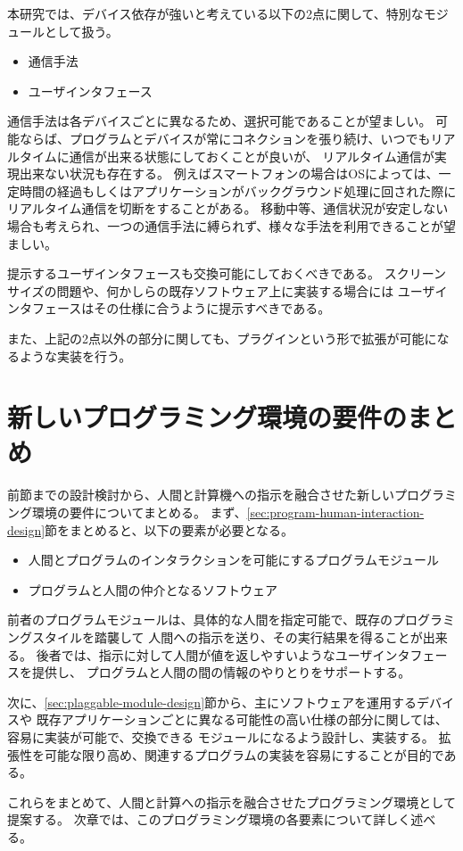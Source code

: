 本研究では、デバイス依存が強いと考えている以下の2点に関して、特別なモジュールとして扱う。

\begin{itemize}
\itemsep1pt\parskip0pt
\item
  通信手法
\item
  ユーザインタフェース
\end{itemize}

通信手法は各デバイスごとに異なるため、選択可能であることが望ましい。
可能ならば、プログラムとデバイスが常にコネクションを張り続け、いつでもリアルタイムに通信が出来る状態にしておくことが良いが、
リアルタイム通信が実現出来ない状況も存在する。
例えばスマートフォンの場合はOSによっては、一定時間の経過もしくはアプリケーションがバックグラウンド処理に回された際に
リアルタイム通信を切断をすることがある。
移動中等、通信状況が安定しない場合も考えられ、一つの通信手法に縛られず、様々な手法を利用できることが望ましい。

提示するユーザインタフェースも交換可能にしておくべきである。
スクリーンサイズの問題や、何かしらの既存ソフトウェア上に実装する場合には
ユーザインタフェースはその仕様に合うように提示すべきである。

また、上記の2点以外の部分に関しても、プラグインという形で拡張が可能になるような実装を行う。

\section{新しいプログラミング環境の要件のまとめ}\label{ux65b0ux3057ux3044ux30d7ux30edux30b0ux30e9ux30dfux30f3ux30b0ux74b0ux5883ux306eux8981ux4ef6ux306eux307eux3068ux3081}

前節までの設計検討から、人間と計算機への指示を融合させた新しいプログラミング環境の要件についてまとめる。
まず、\ref{sec:program-human-interaction-design}節をまとめると、以下の要素が必要となる。

\begin{itemize}
\itemsep1pt\parskip0pt
\item
  人間とプログラムのインタラクションを可能にするプログラムモジュール
\item
  プログラムと人間の仲介となるソフトウェア
\end{itemize}

前者のプログラムモジュールは、具体的な人間を指定可能で、既存のプログラミングスタイルを踏襲して
人間への指示を送り、その実行結果を得ることが出来る。
後者では、指示に対して人間が値を返しやすいようなユーザインタフェースを提供し、
プログラムと人間の間の情報のやりとりをサポートする。

次に、\ref{sec:plaggable-module-design}節から、主にソフトウェアを運用するデバイスや
既存アプリケーションごとに異なる可能性の高い仕様の部分に関しては、容易に実装が可能で、交換できる
モジュールになるよう設計し、実装する。
拡張性を可能な限り高め、関連するプログラムの実装を容易にすることが目的である。

これらをまとめて、人間と計算への指示を融合させたプログラミング環境として提案する。
次章では、このプログラミング環境の各要素について詳しく述べる。

